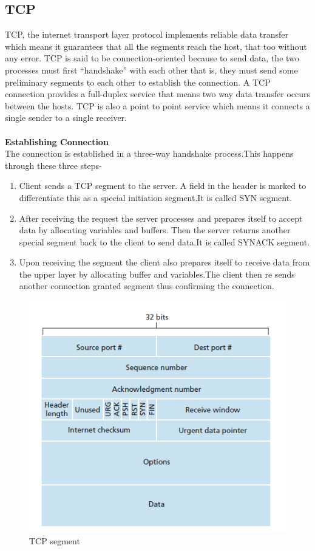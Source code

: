 \documentclass{article}
\begin{document}
\subsection{TCP}
TCP, the internet transport layer protocol implements reliable data transfer which means it guarantees that all the segments reach the host, that too without any error. TCP is said to be connection-oriented because to send data, the two processes must first “handshake” with each other that is, they must send some preliminary segments to each other to establish the connection. A TCP connection provides a full-duplex service that means two way data transfer occurs between the hosts. TCP is also a point to point service which means it connects a single sender to a single receiver.\\\\
\textbf{Establishing Connection}\\
The connection is established in a three-way handshake process.This happens through these three steps-
\begin{enumerate}
    \item Client sends a TCP segment to the server. A field in the header is marked to differentiate this as a special initiation segment.It is called SYN segment.
    \item After receiving the request the server processes and prepares itself to accept data by allocating variables and buffers. Then the server returns another special segment back to the client to send data.It is called SYNACK segment.
    \item Upon receiving the segment the client also prepares itself to receive data from the upper layer by allocating buffer and variables.The client then re sends another connection granted segment thus confirming the connection.
\end{enumerate}
\begin{figure}
\begin{center}
    
    \includegraphics{3.29.png}
    \caption{TCP segment}

\end{center}
 \end{figure}
\end{document}
